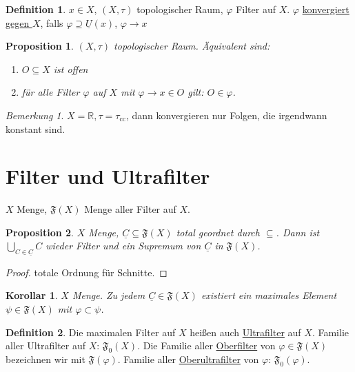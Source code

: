 \documentclass[12pt]{scrartcl}%
\newtheorem{prop}{Proposition}
\newtheorem{korollar}{Korollar}
\theoremstyle{definition}
\newtheorem*{defn}{Definition}
\theoremstyle{remark}
\newtheorem*{nb}{Bemerkung}
\newcommand{\filterset}{\mathfrak{F}}
\begin{document}
\begin{defn}
    $x\in X$, $(X,\tau)$ topologischer Raum, $\varphi$ Filter auf $X$. $\varphi$ \underline{konvergiert gegen $X$}, falls $\varphi\supseteq \underline{U}(x)$, $\varphi \to x$
\end{defn}

\begin{prop}
    $(X,\tau)$ topologischer Raum. Äquivalent sind:

    \begin{enumerate}[label=(\arabic*)]
        \item $O\subseteq X$ ist offen
        \item für alle Filter $\varphi$ auf $X$ mit $\varphi\to x\in O$ gilt: $O\in\varphi$.
    \end{enumerate}
\end{prop}

\begin{nb}
    $X=\mathbb{R}, \tau=\tau_\text{cc}$, dann konvergieren nur Folgen, die irgendwann konstant sind.
\end{nb}

\section*{Filter und Ultrafilter}

$X$ Menge, $\filterset(X)$ Menge aller Filter auf $X$.

\begin{prop}
    $X$ Menge, $\underline{C}\subseteq \filterset(X)$ total geordnet durch $\subseteq$. Dann ist $\bigcup_{C\in\underline{C}} C$ wieder Filter und ein Supremum von $\underline{C}$ in $\filterset(X)$.
\end{prop}

\begin{proof}
    totale Ordnung für Schnitte.
\end{proof}

\begin{korollar}
    $X$ Menge. Zu jedem $\underline{C}\in\filterset(X)$ existiert ein maximales Element $\psi\in\filterset(X)$ mit $\varphi\subset \psi$.
\end{korollar}

\begin{defn}
    Die maximalen Filter auf $X$ heißen auch \underline{Ultrafilter} auf $X$. Familie aller Ultrafilter auf $X$: $\filterset_0(X)$. Die Familie aller \underline{Oberfilter} von $\varphi\in\filterset(X)$ bezeichnen wir mit $\filterset(\varphi)$. Familie aller \underline{Oberultrafilter} von $\varphi$: $\filterset_0(\varphi)$.
\end{defn}
\end{document}
